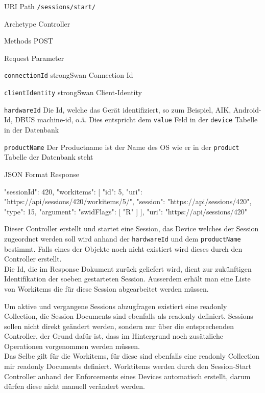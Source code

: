 \begin{mdframed}[style=def]
\begin{description*}
	\item[URI Path] \texttt{/sessions/start/}
	\item[Archetype] Controller
	\item[Methods] POST
	\item[Request Parameter] \hfill
	\begin{description*}
		\item[\texttt{connectionId}] strongSwan Connection Id
		\item[\texttt{clientIdentity}] strongSwan Client-Identity
		\item[\texttt{hardwareId}] Die Id, welche das Gerät identifiziert, so zum
		Beispiel, AIK, Android-Id, DBUS machine-id, o.ä. Dies entspricht dem
		\texttt{value} Feld in der \texttt{device} Tabelle in der Datenbank
		\item[\texttt{productName}] Der Productname ist der Name des OS wie er in der
		\texttt{product} Tabelle der Datenbank steht
	\end{description*}
	\item[JSON Format Response] \hfill
\begin{jsoncode}
{
	"sessionId": 420,
	"workitems": [
		 {
		 	"id": 5,
		 	"uri": "https://api/sessions/420/workitems/5/",
		 	"session": "https://api/sessions/420",
		 	"type": 15,
		 	"argument": {
		 		"swidFlags": [
		 			"R"
		 		]
		 	}
		 }
	],
	"uri": "https://api/sessions/420"
}
\end{jsoncode}
\end{description*}
\end{mdframed}
Dieser Controller erstellt und startet eine Session, das Device welches der
Session zugeordnet werden soll wird anhand der \texttt{hardwareId} und dem
\texttt{productName} bestimmt. Falls eines der Objekte noch nicht existiert wird
dieses durch den Controller erstellt.\\
Die Id, die im Response Dokument zurück geliefert wird, dient zur zukünftigen
Identifikation der soeben gestarteten Session. Ausserdem erhält man eine Liste
von Workitems die für diese Session abgearbeitet werden müssen.

Um aktive und vergangene Sessions abzugfragen existiert eine readonly
Collection, die Session Documents sind ebenfalls als readonly definiert.
Sessions sollen nicht direkt geändert werden, sondern nur über die
entsprechenden Controller, der Grund dafür ist, dass im Hintergrund noch
zusätzliche Operationen vorgenommen werden müssen.\\
Das Selbe gilt für die Workitems, für diese sind ebenfalls eine readonly
Collection mir readonly Documents definiert. Worktitems werden durch den
Session-Start Controller anhand der Enforcements eines Devices automatisch
erstellt, darum dürfen diese nicht manuell verändert werden.

